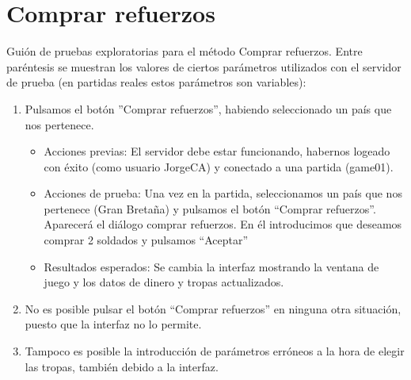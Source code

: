 \section{Comprar refuerzos}

Guión de pruebas exploratorias para el método Comprar refuerzos. Entre paréntesis se muestran los valores de ciertos parámetros utilizados con el servidor de prueba (en partidas
reales estos parámetros son variables):


\begin{enumerate}
\item Pulsamos el botón ''Comprar refuerzos'', habiendo seleccionado un país que nos pertenece.
	\begin{itemize}
	\item Acciones previas: El servidor debe estar funcionando, habernos logeado con éxito (como usuario JorgeCA) y conectado a una partida (game01).
	\item Acciones de prueba: Una vez en la  partida, seleccionamos un país que nos pertenece (Gran Bretaña) y pulsamos el botón ``Comprar refuerzos''.
Aparecerá el diálogo comprar refuerzos. En él introducimos que deseamos comprar 2 soldados y pulsamos ``Aceptar''
	\item Resultados esperados: Se cambia la interfaz mostrando la ventana de juego y los datos de dinero y tropas actualizados.
	\end{itemize}
\item No es posible pulsar el botón ``Comprar refuerzos'' en ninguna otra situación, puesto que la interfaz no lo permite.
\item Tampoco es posible la introducción de parámetros erróneos a la hora de elegir las tropas, también debido a la interfaz.

\end{enumerate}

